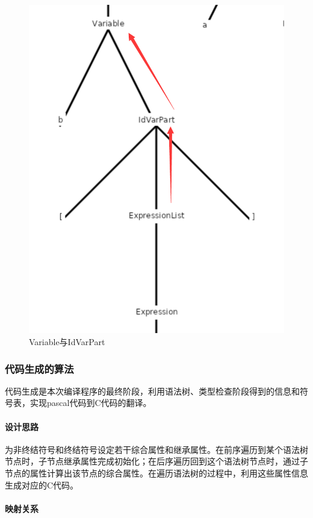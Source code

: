 \documentclass[../main.tex]{subfiles}
\begin{document}
\begin{figure}[htbp]
\centering
\includegraphics[width=0.8\linewidth ]{assets/类型检查/IdVarPart.png}
\caption{Variable与IdVarPart}
\label{fig:Variable与IdVarPart}
\end{figure}

\subsubsection{代码生成的算法}
代码生成是本次编译程序的最终阶段，利用语法树、类型检查阶段得到的信息和符号表，实现pascal代码到C代码的翻译。

\paragraph{设计思路}
为非终结符号和终结符号设定若干综合属性和继承属性。在前序遍历到某个语法树节点时，子节点继承属性完成初始化；在后序遍历回到这个语法树节点时，通过子节点的属性计算出该节点的综合属性。在遍历语法树的过程中，利用这些属性信息生成对应的C代码。

\paragraph{映射关系}
\end{document}
